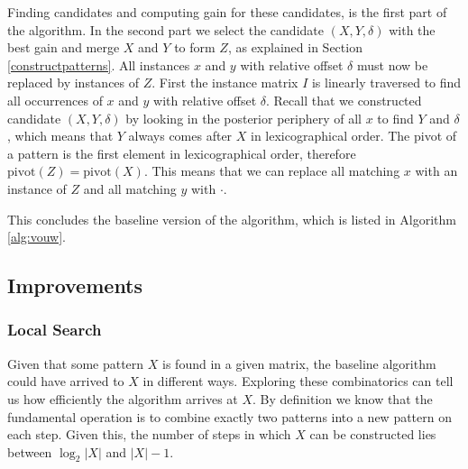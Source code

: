 \documentclass{llncs}
\begin{document}
Finding candidates and computing gain for these candidates, is the first part of the algorithm. In the second part we select the candidate $(X,Y,\delta)$ with the best gain and merge $X$ and $Y$ to form $Z$, as explained in Section \ref{constructpatterns}. All instances $x$ and $y$ with relative offset $\delta$ must now be replaced by instances of $Z$. First the instance matrix $I$ is linearly traversed to find all occurrences of $x$ and $y$ with relative offset $\delta$. Recall that we constructed candidate $(X,Y,\delta)$ by looking in the posterior periphery of all $x$ to find $Y$ and $\delta$, which means that $Y$ always comes after $X$ in lexicographical order. The pivot of a pattern is the first element in lexicographical order, therefore $\mathrm{pivot}(Z) = \mathrm{pivot}(X)$. This means that we can replace all matching $x$ with an instance of $Z$ and all matching $y$ with $\cdot$. 

This concludes the baseline version of the algorithm, which is listed in Algorithm \ref{alg:vouw}. 

\subsection{Improvements}
\label{improvements}
\subsubsection{Local Search}
Given that some pattern $X$ is found in a given matrix, the baseline algorithm could have arrived to $X$ in different ways. Exploring these combinatorics can tell us how efficiently the algorithm arrives at $X$. By definition we know that the fundamental operation is to combine exactly two patterns into a new pattern on each step. Given this, the number of steps in which $X$ can be constructed lies between $\log_2|X|$ and $|X|-1$. 


\end{document}
